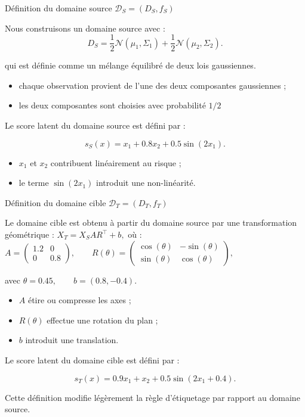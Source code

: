 \documentclass[11pt]{beamer}
\begin{document}
\begin{frame}{Définition du domaine source \texorpdfstring{$\mathcal D_S=(D_S,f_S)$}{DS}}

Nous construisons un domaine source avec : 
\[
D_S=\frac12 \mathcal N(\mu_1,\Sigma_1)
+\frac12 \mathcal N(\mu_2,\Sigma_2).
\]

qui est définie comme un mélange équilibré de deux lois gaussiennes.


\begin{itemize}
    \item chaque observation provient de l'une des deux composantes gaussiennes ;
    \item les deux composantes sont choisies avec probabilité \(1/2\)
\end{itemize}

\vspace{0.2cm}
Le score latent du domaine source est défini par :

\[
s_S(x)=x_1+0.8x_2+0.5\sin(2x_1).
\]

\begin{itemize}
    \item \(x_1\) et \(x_2\) contribuent linéairement au risque ;
    \item le terme \(\sin(2x_1)\) introduit une non-linéarité.
\end{itemize}


\end{frame}




\begin{frame}{Définition du domaine cible \texorpdfstring{$\mathcal D_T=(D_T,f_T)$}{DT}}

Le domaine cible est obtenu à partir du domaine source par une transformation géométrique : $
X_T = X_S A R^\top + b,$
\vspace{0.2cm}
où : $
A=
\begin{pmatrix}
1.2 & 0\\
0 & 0.8
\end{pmatrix},
\qquad
R(\theta)=
\begin{pmatrix}
\cos(\theta) & -\sin(\theta)\\
\sin(\theta) & \cos(\theta)
\end{pmatrix},$

avec $
\theta=0.45,
\qquad
b=(0.8,-0.4).$

\vspace{0.2cm}

\begin{itemize}
    \item \(A\) étire ou compresse les axes ;
    \item \(R(\theta)\) effectue une rotation du plan ;
    \item \(b\) introduit une translation.
\end{itemize}

Le score latent du domaine cible est défini par :

\[
s_T(x)=0.9x_1+x_2+0.5\sin(2x_1+0.4).
\]

Cette définition modifie légèrement la règle d'étiquetage par rapport au domaine source.
\end{frame}
\end{document}

